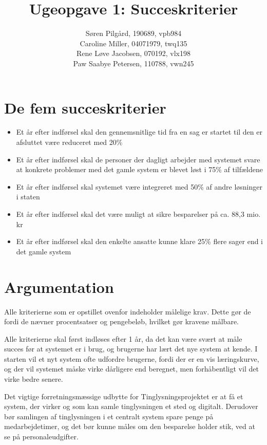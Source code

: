 \documentclass[10pt,a4paper,danish]{article}
\title{Ugeopgave 1: Succeskriterier}
\author{Søren Pilgård, 190689, vpb984\\
Caroline Miller, 04071979, twq135\\
Rene Løve Jacobsen, 070192, vlx198\\
Paw Saabye Petersen, 110788, vwn245}
\begin{document}
\maketitle
\newpage


\section{De fem succeskriterier}

\begin{itemize}
\item Et år efter indførsel skal den gennemsnitlige tid fra en sag er startet til den er afsluttet være reduceret med 20\%
\item Et år efter indførsel skal de personer der dagligt arbejder med systemet svare at konkrete problemer med det gamle system er blevet løst i 75\% af tilfældene
\item Et år efter indførsel skal systemet være integreret med 50\% af andre løsninger i staten
\item Et år efter indførsel skal det være muligt at sikre besparelser på ca. 88,3 mio. kr
\item Et år efter indførsel skal den enkelte ansatte kunne klare 25\% flere sager end i det gamle system
\end{itemize}

\section{Argumentation}
Alle kriterierne som er opstillet ovenfor indeholder målelige krav. Dette gør de fordi de nævner procentsatser og pengebeløb, hvilket gør kravene målbare.

Alle kriterierne skal først indløses efter 1 år, da det kan være svært at måle succes før at systemet er i brug, og brugerne har lært det nye system at kende. I starten vil et nyt system ofte udfordre brugerne, fordi der er en vis læringskurve, og der vil systemet måske virke dårligere end beregnet, men forhåbentligt vil det virke bedre senere.

Det vigtige forretningsmæssige udbytte for Tinglysningsprojektet er at få et system, der virker og som kan samle tinglysningen et sted og digitalt. Derudover bør samlingen af tinglysningen i et centralt system spare penge på medarbejdetimer, og det bør kunne måles om den besparelse holder stik, ved at se på personaleudgifter.
\end{document}
